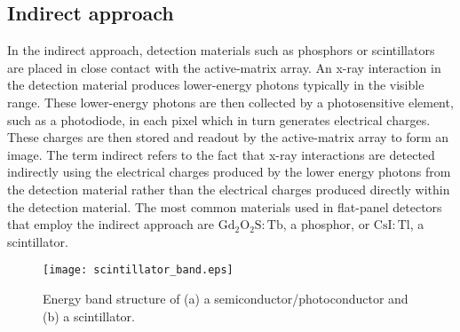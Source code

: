 \subsection{Indirect approach}
In the indirect approach, detection materials such as phosphors or scintillators are placed in close contact with the active-matrix array.  An x-ray interaction in the detection material produces lower-energy photons typically in the visible range.  These lower-energy photons are then collected by a photosensitive element, such as a photodiode, in each pixel which in turn generates electrical charges.  These charges are then stored and readout by the active-matrix array to form an image.  The term indirect refers to the fact that x-ray interactions are detected indirectly using the electrical charges produced by the lower energy photons from the detection material rather than the electrical charges produced directly within the detection material.  The most common materials used in flat-panel detectors that employ the indirect approach are $\mathrm{Gd_2O_2S:Tb}$, a phosphor, or $\mathrm{CsI:Tl}$, a scintillator. 

\begin{figure}[h]
\centering
\texttt{[image: scintillator\_band.eps]}
\caption{Energy band structure of (a) a semiconductor/photoconductor and (b) a scintillator.}
\label{fig:scintillator_band}
\end{figure}


